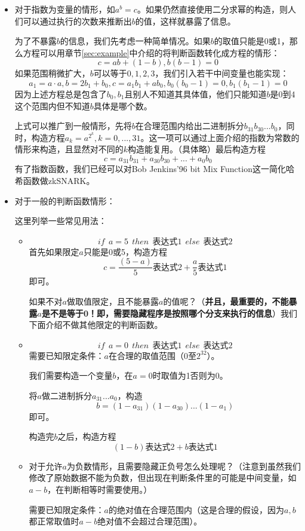 \documentclass[12pt]{article}
\newcommand{\zk}{zkSNARK}
\begin{document}
\begin{itemize}
	\item 对于指数为变量的情形，如$a^b=c$。如果仍然直接使用二分求幂的构造，则人们可以通过执行的次数来推断出$b$的值，这样就暴露了信息。
	
	为了不暴露$b$的信息，我们先考虑一种简单情况。如果$b$的取值只能是0或1，那么方程可以用章节\ref{sec:example}中介绍的将判断函数转化成方程的情形：
	$$ c= ab+(1-b), b(b-1) = 0$$
	如果范围稍微扩大，$b$可以等于$0,1,2,3$，我们引入若干中间变量也能实现：
	$$a_1=a\cdot a, b=2b_1+b_0, c=a_1b_1+ab_0, b_0(b_0-1)=0, b_1(b_1-1)=0$$
	因为上述方程总是包含了$b_0,b_1$且别人不知道其具体值，他们只能知道$b$是0到4这个范围内但不知道$b$具体是哪个数。
	
	上式可以推广到一般情形，先将$b$在合理范围内给出二进制拆分$b_{31}b_{30}...b_0$，同时，构造方程$a_k=a^{2^k},k=0,...,31$。这一项可以通过上面介绍的指数为常数的情形来构造，且显然对不同的$k$构造能复用。（具体略）最后构造方程
	$$c= a_{31}b_{31}+a_{30}b_{30}+...+a_0b_0$$
	有了指数函数，我们已经可以对Bob Jenkins'96 bit Mix Function这一简化哈希函数做\zk。
	\item 对于一般的判断函数情形：
	
	这里列举一些常见用法：
	\begin{itemize} 
    \item	$$if~~a=5~~then~~\mbox{表达式1}~~else~~\mbox{表达式2}$$
     首先如果限定$a$只能是0或5，构造方程 $$c=\frac{(5-a)}{5}\mbox{表达式2}+\frac{a}{5}\mbox{表达式1}$$即可。
     
     如果不对$a$做取值限定，且不能暴露$a$的值呢？（\textbf{并且，最重要的，不能暴露$a$是不是等于0！即，需要隐藏程序是按照哪个分支来执行的信息}）我们下面介绍不做其他限定的判断函数。
     \item $$if~~a=0~~then~~\mbox{表达式1}~~else~~\mbox{表达式2}$$
     需要已知限定条件：$a$在合理的取值范围（$0$至$2^{32}$）。
     
     我们需要构造一个变量$b$，在$a = 0$时取值为1否则为0。
     
     将$a$做二进制拆分$a_{31}...a_0$，构造
     $$b=(1-a_{31})(1-a_{30})...(1-a_1)$$即可。
     
     构造完$b$之后，构造方程$$(1-b)\mbox{表达式2}+b\mbox{表达式1}$$
     
     \item 对于允许$a$为负数情形，且需要隐藏正负号怎么处理呢？（注意到虽然我们修改了原始数据不能为负数，但出现在判断条件里的可能是中间变量，如$a-b$，在判断相等时需要使用。）
     
     需要已知限定条件：$a$的绝对值在合理范围内（这是合理的假设，因为$a,b$都正常取值时$a-b$绝对值不会超过合理范围）。
          

\end{itemize}
\end{itemize}
\end{document}
